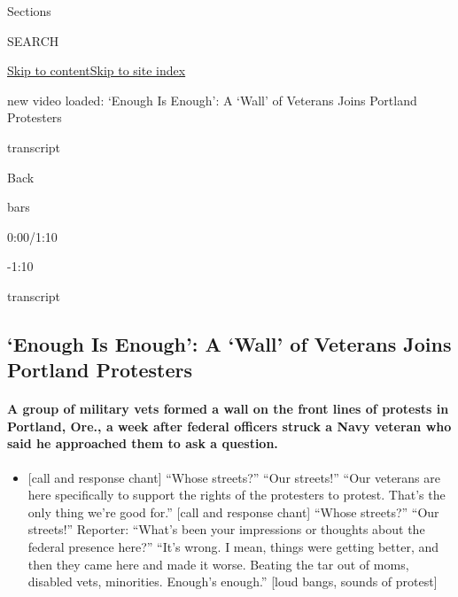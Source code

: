 Sections

SEARCH

\protect\hyperlink{site-content}{Skip to
content}\protect\hyperlink{site-index}{Skip to site index}

new video loaded: `Enough Is Enough': A `Wall' of Veterans Joins
Portland Protesters

transcript

Back

bars

0:00/1:10

-1:10

transcript

\hypertarget{enough-is-enough-a-wall-of-veterans-joins-portland-protesters}{%
\subsection{`Enough Is Enough': A `Wall' of Veterans Joins Portland
Protesters}\label{enough-is-enough-a-wall-of-veterans-joins-portland-protesters}}

\hypertarget{a-group-of-military-vets-formed-a-wall-on-the-front-lines-of-protests-in-portland-ore-a-week-after-federal-officers-struck-a-navy-veteran-who-said-he-approached-them-to-ask-a-question}{%
\paragraph{A group of military vets formed a wall on the front lines of
protests in Portland, Ore., a week after federal officers struck a Navy
veteran who said he approached them to ask a
question.}\label{a-group-of-military-vets-formed-a-wall-on-the-front-lines-of-protests-in-portland-ore-a-week-after-federal-officers-struck-a-navy-veteran-who-said-he-approached-them-to-ask-a-question}}

\begin{itemize}
\tightlist
\item
  {[}call and response chant{]} ``Whose streets?'' ``Our streets!''
  ``Our veterans are here specifically to support the rights of the
  protesters to protest. That's the only thing we're good for.'' {[}call
  and response chant{]} ``Whose streets?'' ``Our streets!'' Reporter:
  ``What's been your impressions or thoughts about the federal presence
  here?'' ``It's wrong. I mean, things were getting better, and then
  they came here and made it worse. Beating the tar out of moms,
  disabled vets, minorities. Enough's enough.'' {[}loud bangs, sounds of
  protest{]}
\end{itemize}

